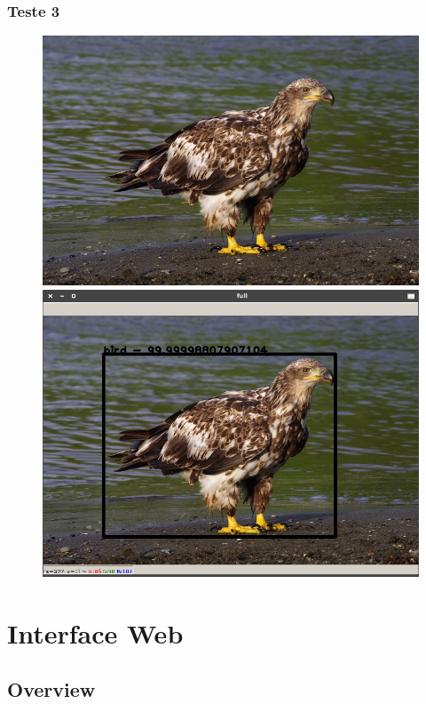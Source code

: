 \documentclass{beamer}
\begin{document}
\begin{frame}
	\frametitle{Teste 3}
	\begin{figure}
		\includegraphics[scale=0.2]{../media/eagle}
		\hspace{0.6cm}
		\includegraphics[scale=0.2]{Imgs/bird}
	\end{figure}

\end{frame}

	\section{Interface Web}
	\subsection{Overview}
	
\end{document}
